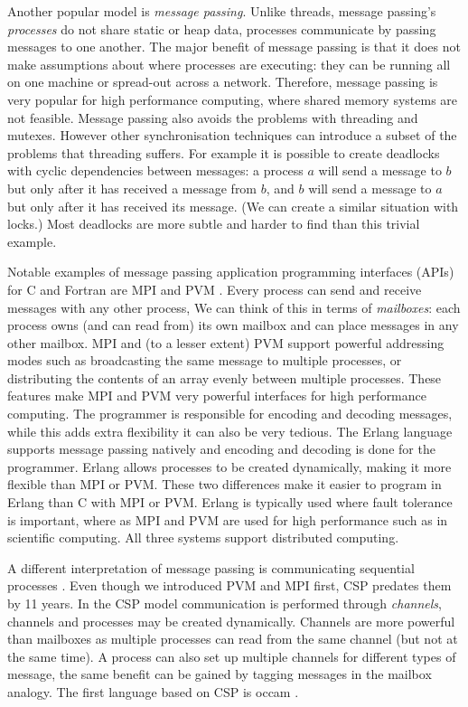 Another popular model is \emph{message passing}.
Unlike threads, message passing's \emph{processes} do not share static or heap
data,
processes communicate by passing messages to one another.
The major benefit of message passing is that it does not make assumptions about where processes
are executing:
they can be running all on one machine or spread-out across a network.
Therefore, message passing is very popular for high performance computing,
where shared memory systems are not feasible.
Message passing also avoids the problems with threading and mutexes.
However other synchronisation techniques can introduce a subset of the
problems that threading suffers.
For example it is possible to create deadlocks with cyclic dependencies
between messages:
a process $a$ will send a message to $b$ but only after it has received a
message from $b$,
and $b$ will send a message to $a$ but only after it has received its message.
(We can create a similar situation with locks.)
Most deadlocks are more subtle and harder to find than this trivial example.

Notable examples of message passing application programming interfaces (APIs)
for C and Fortran \citep{backus:1957:fortran} are
MPI \citep{mpi} and PVM \citep{pvm}.
Every process can send and receive messages with any other process,
We can think of this in terms of \emph{mailboxes}:
each process owns (and can read from) its own mailbox and can place messages
in any other mailbox.
MPI and (to a lesser extent) PVM
support powerful addressing modes
such as broadcasting the same message to multiple processes, or
distributing the contents of an array evenly between
multiple processes.
These features make MPI and PVM very powerful interfaces for high performance
computing.
The programmer is responsible for encoding and decoding messages,
while this adds extra flexibility it can also be very tedious.
The Erlang language \citep{erlang} supports message passing natively and
encoding and decoding is done for the programmer.
Erlang allows processes to be created dynamically,
making it more flexible than MPI or PVM.
These two differences make it easier to program in Erlang than C with MPI or
PVM.
Erlang is typically used where fault tolerance is important,
where as MPI and PVM are used for high performance such as in scientific
computing.
All three systems support distributed computing.

A different interpretation of message passing is
communicating sequential processes \citep{hoare:1978:csp}.
Even though we introduced PVM and MPI first, CSP predates them by 11 years.
In the CSP model communication is performed through \emph{channels},
channels and processes may be created dynamically.
Channels are more powerful than mailboxes as multiple processes can read from
the same channel (but not at the same time).
A process can also set up multiple channels for different types of message,
the same benefit can be gained by tagging messages in the mailbox analogy.
The first language based on CSP is occam \citep{occam1, occam3}.

